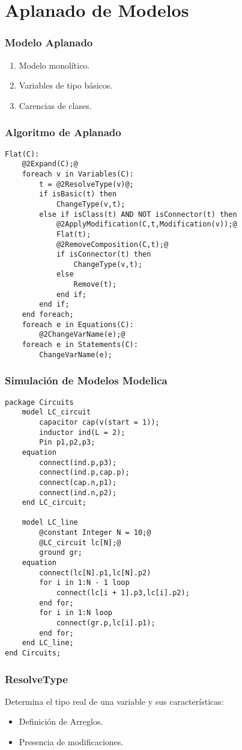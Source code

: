 \section{Aplanado de Modelos}

\begin{frame}[fragile]
\frametitle{Modelo Aplanado} 
\begin{enumerate}
\item Modelo monol\'itico.
\item Variables de tipo b\'asicos.
\item Carencias de clases.

\end{enumerate}
\end{frame}


\begin{frame}[fragile]
\frametitle{Algoritmo de Aplanado} 
\begin{lstlisting}[style=base,basicstyle=\tiny]
Flat(C):
    @2Expand(C);@
    foreach v in Variables(C):
        t = @2ResolveType(v)@;
        if isBasic(t) then 
            ChangeType(v,t);
        else if isClass(t) AND NOT isConnector(t) then
            @2ApplyModification(C,t,Modification(v));@
            Flat(t);
            @2RemoveComposition(C,t);@  
            if isConnector(t) then
                ChangeType(v,t);
            else
                Remove(t);
            end if;     
        end if;     
    end foreach;    
    foreach e in Equations(C):  
        @2ChangeVarName(e);@
    foreach e in Statements(C): 
        ChangeVarName(e);           
\end{lstlisting}
\end{frame}

\begin{frame}[fragile]
\frametitle{Simulaci\'on de Modelos Modelica} 
\begin{lstlisting}[style=base,basicstyle=\tiny]
package Circuits
    model LC_circuit
        capacitor cap(v(start = 1));
        inductor ind(L = 2);
        Pin p1,p2,p3;
    equation
        connect(ind.p,p3);
        connect(ind.p,cap.p);
        connect(cap.n,p1);
        connect(ind.n,p2);
    end LC_circuit;
    
    model LC_line
        @constant Integer N = 10;@
        @LC_circuit lc[N];@
        ground gr;
    equation
        connect(lc[N].p1,lc[N].p2)      
        for i in 1:N - 1 loop
            connect(lc[i + 1].p3,lc[i].p2);
        end for;
        for i in 1:N loop
            connect(gr.p,lc[i].p1);
        end for;
    end LC_line;
end Circuits;   
\end{lstlisting}
\end{frame}



\begin{frame}[fragile]
\frametitle{ResolveType} 
Determina el tipo real de una variable y sus caracter\'isticas: 
\begin{itemize}
	\item Definici\'on de Arreglos. 
	\item Presencia de modificaciones.
\end{itemize}



\end{frame}
